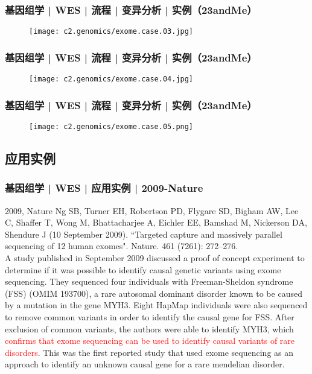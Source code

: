 \begin{frame}
  \frametitle{基因组学 | WES | 流程 | 变异分析 | 实例（23andMe）}
  \begin{figure}
    \centering
    \texttt{[image: c2.genomics/exome.case.03.jpg]}
  \end{figure}
\end{frame}

\begin{frame}
  \frametitle{基因组学 | WES | 流程 | 变异分析 | 实例（23andMe）}
  \begin{figure}
    \centering
    \texttt{[image: c2.genomics/exome.case.04.jpg]}
  \end{figure}
\end{frame}

\begin{frame}
  \frametitle{基因组学 | WES | 流程 | 变异分析 | 实例（23andMe）}
  \begin{figure}
    \centering
    \texttt{[image: c2.genomics/exome.case.05.png]}
  \end{figure}
\end{frame}

\subsection{应用实例}
\begin{frame}
  \frametitle{基因组学 | WES | 应用实例 | 2009-Nature}
  \footnotesize{
    \begin{block}{2009, Nature}
  Ng SB, Turner EH, Robertson PD, Flygare SD, Bigham AW, Lee C, Shaffer T, Wong M, Bhattacharjee A, Eichler EE, Bamshad M, Nickerson DA, Shendure J (10 September 2009). ``Targeted capture and massively parallel sequencing of 12 human exomes". Nature. 461 (7261): 272–276.\\
  \vspace{1em}
  A study published in September 2009 discussed a proof of concept experiment to determine if it was possible to identify causal genetic variants using exome sequencing. They sequenced four individuals with Freeman-Sheldon syndrome (FSS) (OMIM 193700), a rare autosomal dominant disorder known to be caused by a mutation in the gene MYH3. Eight HapMap individuals were also sequenced to remove common variants in order to identify the causal gene for FSS. After exclusion of common variants, the authors were able to identify MYH3, which \textcolor{red}{confirms that exome sequencing can be used to identify causal variants of rare disorders}. This was the first reported study that used exome sequencing as an approach to identify an unknown causal gene for a rare mendelian disorder.
    \end{block}
}
\end{frame}

